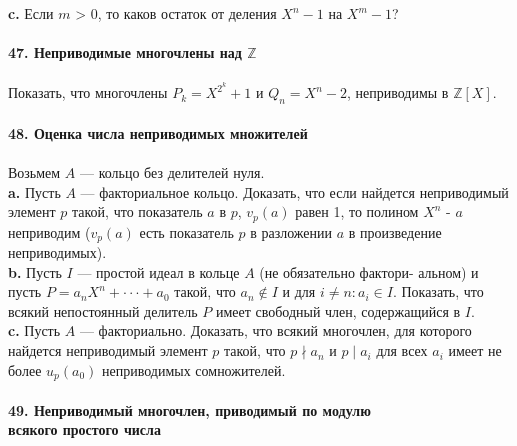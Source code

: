 \noindent\hspace*{10pt}\textbf{c.} Если $m$ > 0, то каков остаток от деления $X^n  - 1$ на $X^m -1$?
\\
\\
\noindent\textbf{47. Неприводимые многочлены над $\mathbb{Z}$}\\\\
\hspace*{10pt} Показать, что многочлены $P_k=X^{2^{k}}+1$ и $Q_n=X^n-2$, неприводимы\linebreak
в $\mathbb{Z}[X]$.
\\
\\
\noindent\textbf{48. Оценка числа неприводимых множителей}\\\\
\hspace*{10pt} Возьмем $A$ — кольцо без делителей нуля.\\
\hspace*{10pt}\textbf{a.} Пусть $A$ — факториальное кольцо. Доказать, что если найдется\linebreak
неприводимый элемент $p$ такой, что показатель $a$ в $p$, $v_p(a)$ равен 1, то\linebreak
полином $X^n$ - $a$ неприводим ($v_p(a)$ есть показатель $p$ в разложении $a$ в\linebreak
произведение неприводимых).\\
\hspace*{10pt}\textbf{b.} Пусть $I$ — простой идеал в кольце $A$ (не обязательно фактори-\linebreak
альном) и пусть $P=a_nX^n+\cdot\cdot\cdot+a_0$ такой, что $a_n\notin I$ и для $i\neq n:a_i\in I$.\linebreak
Показать, что всякий непостоянный делитель $P$ имеет свободный член,\linebreak
содержащийся в $I$.\\
\hspace*{10pt}\textbf{c.} Пусть $A$ — факториально. Доказать, что всякий многочлен, для\linebreak
которого найдется неприводимый элемент $p$ такой, что $p\nmid a_n$ и $p\;|\;a_i$\linebreak
для всех $a_i$ имеет не более $u_p(a_0)$ неприводимых сомножителей.
\\
\\
\noindent\textbf{49. Неприводимый многочлен, приводимый по модулю\\
всякого простого числа}\\\\
